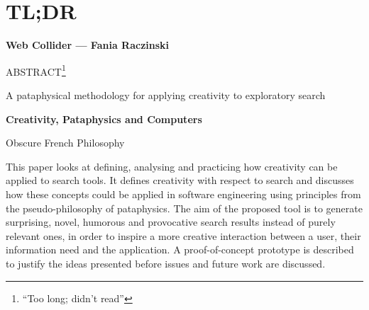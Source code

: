 
\pagestyle{empty}

\chapter{TL;DR}
\label{abstract}

{\Large \textbf{Web Collider --- Fania Raczinski}}

\vspace{0.5cm}
ABSTRACT\footnote{``Too long; didn't read''}

A pataphysical methodology for applying creativity to exploratory search

\vspace{1cm}

{\Large \textbf{Creativity, Pataphysics and Computers}}

Obscure French Philosophy

This paper looks at defining, analysing and practicing how creativity can be applied to search tools. It defines creativity with respect to search and discusses how these concepts could be applied in software engineering using principles from the pseudo-philosophy of pataphysics. The aim of the proposed tool is to generate surprising, novel, humorous and provocative search results instead of purely relevant ones, in order to inspire a more creative interaction between a user, their information need and the application. A proof-of-concept prototype is described to justify the ideas presented before issues and future work are discussed.

\clearpage
